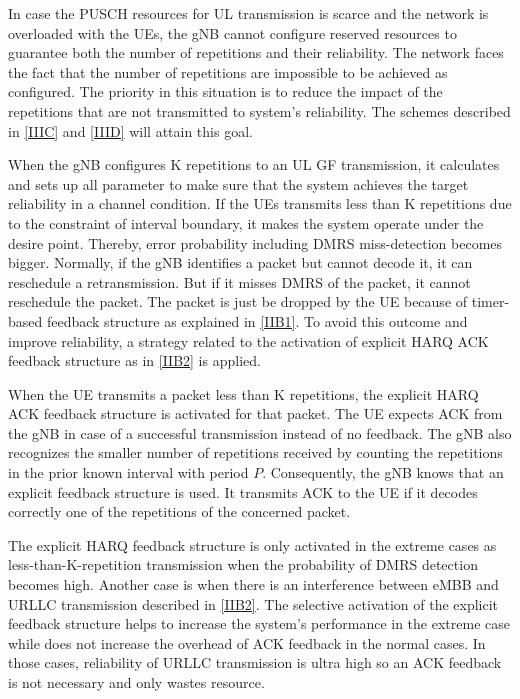 \documentclass{ieeeaccess}
\begin{document}
In case the PUSCH resources for UL transmission is scarce and the network is overloaded with the UEs, the gNB cannot configure reserved resources to guarantee both the number of repetitions and their reliability. The network faces the fact that the number of repetitions are impossible to be achieved as configured. The priority in this situation is to reduce the impact of the repetitions that are not transmitted to system's reliability. The schemes described in \ref{IIIC} and \ref{IIID} will attain this goal.

When the gNB configures K repetitions to an UL GF transmission, it calculates and sets up all parameter to make sure that the system achieves the target reliability in a channel condition. If the UEs transmits less than K repetitions due to the constraint of interval boundary, it makes the system operate under the desire point. Thereby, error probability including DMRS miss-detection becomes bigger. Normally, if the gNB identifies a packet but cannot decode it, it can reschedule a retransmission. But if it misses DMRS of the packet, it cannot reschedule the packet. The packet is just be dropped by the UE because of timer-based feedback structure as explained in \ref{IIB1}. To avoid this outcome and improve reliability, a strategy related to the activation of explicit HARQ ACK feedback structure as in \ref{IIB2} is applied.

When the UE transmits a packet less than K repetitions, the explicit HARQ ACK feedback structure is activated for that packet. The UE expects ACK from the gNB in case of a successful transmission instead of no feedback. The gNB also recognizes the smaller number of repetitions received by counting the repetitions in the prior known interval with period $P$. Consequently, the gNB knows that an explicit feedback structure is used. It transmits ACK to the UE if it decodes correctly one of the repetitions of the concerned packet.

The explicit HARQ feedback structure is only activated in the extreme cases as less-than-K-repetition transmission when the probability of DMRS detection becomes high. Another case is when there is an interference between eMBB and URLLC transmission described in \ref{IIB2}. The selective activation of the explicit feedback structure helps to increase the system's performance in the extreme case while does not increase the overhead of ACK feedback in the normal cases. In those cases, reliability of URLLC transmission is ultra high so an ACK feedback is not necessary and only wastes resource.
\end{document}
